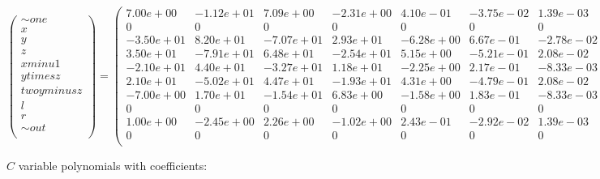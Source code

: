 \documentclass[11pt]{article}
\begin{document}
\(\begin{pmatrix} \sim{one} \\ x \\ y \\ z \\ xminu1 \\ ytimesz \\ twoyminusz \\ l \\ r \\ \sim{out} \\ \end{pmatrix} = \begin{pmatrix} 7.00e+00& -1.12e+01& 7.09e+00& -2.31e+00& 4.10e-01& -3.75e-02& 1.39e-03 \\0&0&0&0&0&0&0 \\-3.50e+01& 8.20e+01& -7.07e+01& 2.93e+01& -6.28e+00& 6.67e-01& -2.78e-02 \\3.50e+01& -7.91e+01& 6.48e+01& -2.54e+01& 5.15e+00& -5.21e-01& 2.08e-02 \\-2.10e+01& 4.40e+01& -3.27e+01& 1.18e+01& -2.25e+00& 2.17e-01& -8.33e-03 \\2.10e+01& -5.02e+01& 4.47e+01& -1.93e+01& 4.31e+00& -4.79e-01& 2.08e-02 \\-7.00e+00& 1.70e+01& -1.54e+01& 6.83e+00& -1.58e+00& 1.83e-01& -8.33e-03 \\0&0&0&0&0&0&0 \\1.00e+00& -2.45e+00& 2.26e+00& -1.02e+00& 2.43e-01& -2.92e-02& 1.39e-03 \\0&0&0&0&0&0&0 \\ \end{pmatrix} \cdot \begin{pmatrix} 1 \\ x \\ x^2 \\ x^3 \\ x^4 \\ x5 \\ x6 \end{pmatrix}\)

\(C\) variable polynomials with coefficients:
\end{document}
